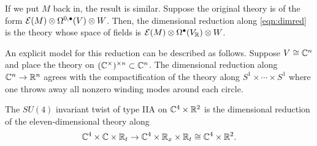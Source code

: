 If we put $M$ back in, the result is similar. 
Suppose the original theory is of the form $\mathcal E(M) \otimes \Omega^{0,\bullet}(V) \otimes W$.
Then, the dimensional reduction along \eqref{eqn:dimred} is the theory whose space of fields is $\mathcal E(M) \otimes \Omega^\bullet(V_\mathbb R) \otimes W$.

An explicit model for this reduction can be described as follows. 
Suppose $V \cong \mathbb C^n$ and place the theory on $(\mathbb C^\times)^{\times n} \subset \mathbb C^n$. 
The dimensional reduction along $\mathbb C^n \to \mathbb R^n$ agrees with the compactification of the theory along $S^1 \times \cdots \times S^1$ where one throws away all nonzero winding modes around each circle.

\begin{prop}\label{prop:dimred}
The $SU(4)$ invariant twist of type IIA on $\mathbb C^4 \times \mathbb R^2$ is the dimensional reduction of the eleven-dimensional theory along  
\[
\mathbb C^4 \times \mathbb C \times \mathbb R_t \to \mathbb C^4 \times \mathbb R_x \times \mathbb R_t \cong \mathbb C^4 \times \mathbb R^2 .
\]
\end{prop}
